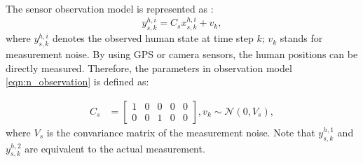 \documentclass[journal]{IEEEtran}
\begin{document}
	
	
	
	
	The sensor observation model is represented as : 
\begin{equation}
		y_{s,k}^{h,i}=C_sx_{s,k}^{h,i}+v_k,\label{eqn:n_observation}
	\end{equation}\normalsize
	where $y_{s,k}^{h,i}$ denotes the observed human state at time step $k$; $v_k$ stands for measurement noise. 
    By using GPS or camera sensors, the human positions can be directly measured. 
	Therefore, the parameters in observation model \cref{eqn:n_observation} is defined as:
	\addtocounter{equation}{-1}
   \begin{subequations}
		\begin{align*}
			C_s&=\left[
			\begin{array}{ccccc}
				1& 0& 0& 0& 0\\
				0& 0& 1& 0& 0
			\end{array}\right],
			v_k\sim\mathcal{N}(0,V_s),
		\end{align*}
	\end{subequations}\normalsize
	where $V_s$ is the convariance matrix of the measurement noise. Note that $y_{s,k}^{h,1}$ and $y_{s,k}^{h,2}$ are  equivalent to the actual measurement.  
    
	
	
\end{document}
